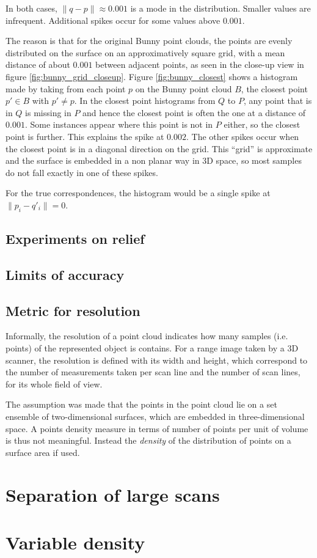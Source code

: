 In both cases, $\| q - p \| \approx 0.001$ is a mode in the distribution. Smaller values are infrequent. Additional spikes occur for some values above $0.001$. 

The reason is that for the original Bunny point clouds, the points are evenly distributed on the surface on an approximatively square grid, with a mean distance of about $0.001$ between adjacent points, as seen in the close-up view in figure \ref{fig:bunny_grid_closeup}. Figure \ref{fig:bunny_closest} shows a histogram made by taking from each point $p$ on the Bunny point cloud $B$, the closest point $p' \in B$ with $p' \neq p$. In the closest point histograms from $Q$ to $P$, any point that is in $Q$ is missing in $P$ and hence the closest point is often the one at a distance of $0.001$. Some instances appear where this point is not in $P$ either, so the closest point is further. This explains the spike at $0.002$. The other spikes occur when the closest point is in a diagonal direction on the grid. This ``grid'' is approximate and the surface is embedded in a non planar way in 3D space, so most samples do not fall exactly in one of these spikes.

For the true correspondences, the histogram would be a single spike at $\|p_i - q'_i\| = 0$. 



\subsection{Experiments on relief}



\subsection{Limits of accuracy}




\subsection{Metric for resolution}
Informally, the resolution of a point cloud indicates how many samples (i.e. points) of the represented object is contains. For a range image taken by a 3D scanner, the resolution is defined with its width and height, which correspond to the number of measurements taken per scan line and the number of scan lines, for its whole field of view.

The assumption was made that the points in the point cloud lie on a set ensemble of two-dimensional surfaces, which are embedded in three-dimensional space. A points density measure in terms of number of points per unit of volume is thus not meaningful. Instead the \emph{density} of the distribution of points on a surface area if used.




\section{Separation of large scans}

\section{Variable density}
